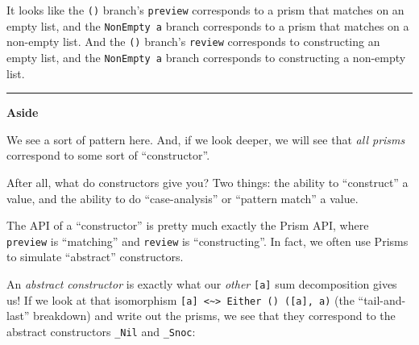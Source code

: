 \documentclass[]{article}
\begin{document}
It looks like the \texttt{()} branch's \texttt{preview} corresponds to a prism
that matches on an empty list, and the \texttt{NonEmpty\ a} branch corresponds
to a prism that matches on a non-empty list. And the \texttt{()} branch's
\texttt{review} corresponds to constructing an empty list, and the
\texttt{NonEmpty\ a} branch corresponds to constructing a non-empty list.

\begin{center}\rule{0.5\linewidth}{\linethickness}\end{center}

\textbf{Aside}

We see a sort of pattern here. And, if we look deeper, we will see that
\emph{all prisms} correspond to some sort of ``constructor''.

After all, what do constructors give you? Two things: the ability to
``construct'' a value, and the ability to do ``case-analysis'' or ``pattern
match'' a value.

The API of a ``constructor'' is pretty much exactly the Prism API, where
\texttt{preview} is ``matching'' and \texttt{review} is ``constructing''. In
fact, we often use Prisms to simulate ``abstract'' constructors.

An \emph{abstract constructor} is exactly what our \emph{other} \texttt{{[}a{]}}
sum decomposition gives us! If we look at that isomorphism
\texttt{{[}a{]}\ \textless{}\textasciitilde{}\textgreater{}\ Either\ ()\ ({[}a{]},\ a)}
(the ``tail-and-last'' breakdown) and write out the prisms, we see that they
correspond to the abstract constructors \texttt{\_Nil} and \texttt{\_Snoc}:
\end{document}
